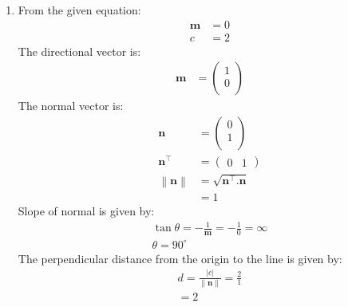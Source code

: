 \documentclass[12pt]{article}
\providecommand{\norm}[1]{\left\lVert#1\right\rVert}
\newcommand{\myvec}[1]{\ensuremath{\begin{pmatrix}#1\end{pmatrix}}}
\let\vec\mathbf
\begin{document}
\begin{enumerate}
\item From the given equation:
         \begin{align}                                                                                                 \vec{m}&=0\\                                                                        			c&=2
         \end{align}                                                                                          The directional vector is:
          \begin{align}
                  \vec{m}&=\myvec{1\\0\\}
          \end{align}
          The normal vector is:
                  \begin{align}
         \vec{n}&=\myvec{0\\1\\}\\
          \vec{n}^\top&=\myvec{0 & 1}\\
                       \norm{\vec{n}}&=\sqrt{\vec{n}^\top.\vec{n}}\\
                          &=1
                          \end{align}
          Slope of normal is given by:
		\begin{align}                                                                                                 \tan\theta=-\frac{1}{\vec{m}}=-\frac{1}{0}=\infty\\                             \theta=90^\circ
                \end{align}                                                                                 The perpendicular distance from the origin to the line is given by:                                          \begin{align}
			d=\frac{|c|}{\norm{\vec{n}}}=\frac{2}{1}\\                                                              =2
                  \end{align}
	

\end{enumerate}
\end{document}
